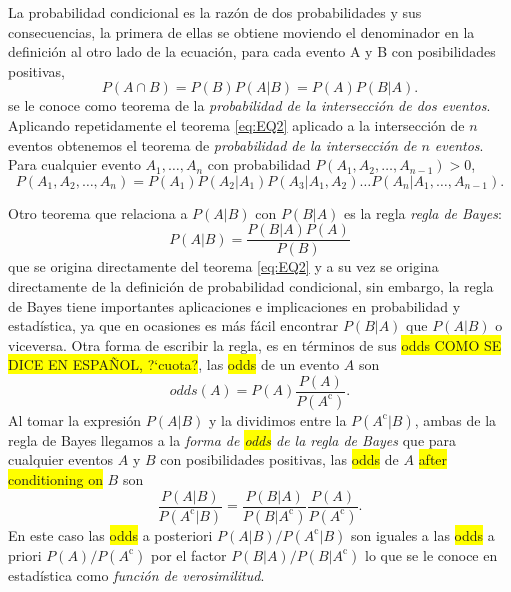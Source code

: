 \documentclass[12pt,letterpaper]{article}
\begin{document}
La probabilidad condicional es la razón de dos probabilidades y sus consecuencias, la primera de ellas se obtiene moviendo el denominador en la definición al otro lado de la ecuación, para cada evento {A} y {B} con posibilidades positivas,
\begin{equation}\label{eq:EQ2}
P(A\cap B)=P(B)P(A|B)=P(A)P(B|A).
\end{equation}
se le conoce como teorema de la \emph{probabilidad de la intersección de dos eventos}. Aplicando repetidamente el teorema \eqref{eq:EQ2} aplicado a la intersección de $n$ eventos obtenemos el teorema de \emph{probabilidad de la intersección de $n$ eventos}. Para cualquier evento $A_1,\ldots,A_n$ con probabilidad $P(A_1,A_2,\ldots,A_{n-1})>0$,
\begin{equation}
P(A_1,A_2,\ldots,A_n)=P(A_1)P(A_2|A_1)P(A_3|A_1,A_2)\ldots P(A_n|A_1,\ldots,A_{n-1}).
\end{equation}

Otro teorema que relaciona a $P(A|B)$ con $P(B|A)$ es la regla \emph{regla de Bayes}:
\begin{equation}
P(A|B)=\frac{P(B|A)P(A)}{P(B)}
\end{equation}
que se origina directamente del teorema \eqref{eq:EQ2} y a su vez se origina directamente de la definición de probabilidad condicional, sin embargo, la regla de Bayes tiene importantes aplicaciones e implicaciones en probabilidad y estadística, ya que en ocasiones es más fácil encontrar $P(B|A)$ que $P(A|B)$ o viceversa. Otra forma de escribir la regla, es en términos de sus \colorbox{yellow}{odds COMO SE DICE EN ESPAÑOL, ?`cuota?}, las \colorbox{yellow}{odds} de un evento $A$ son
\begin{equation}
odds(A)=P(A)\frac{P(A)}{P(A^\text{c})}.
\end{equation}
Al tomar la expresión $P(A|B)$ y la dividimos entre la $P(A^\text{c}|B)$, ambas de la regla de Bayes llegamos a la \emph{forma de \colorbox{yellow}{odds} de la regla de Bayes} que para cualquier eventos $A$ y $B$ con posibilidades positivas, las \colorbox{yellow}{odds} de $A$ \colorbox{yellow}{after conditioning on} $B$ son
\begin{equation}
\frac{P(A|B)}{P(A^\text{c}|B)}=\frac{P(B|A)}{P(B|A^\text{c})}\frac{P(A)}{P(A^\text{c})}.
\end{equation}
En este caso las \colorbox{yellow}{odds} a posteriori $P(A|B)/P(A^\text{c}|B)$ son iguales a las \colorbox{yellow}{odds} a priori $P(A)/P(A^\text{c})$ por el factor $P(B|A)/P(B|A^\text{c})$ lo que se le conoce en estadística como \emph{función de verosimilitud}.
\end{document}
